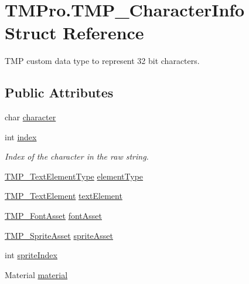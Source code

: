 \hypertarget{struct_t_m_pro_1_1_t_m_p___character_info}{}\section{T\+M\+Pro.\+T\+M\+P\+\_\+\+Character\+Info Struct Reference}
\label{struct_t_m_pro_1_1_t_m_p___character_info}


T\+MP custom data type to represent 32 bit characters.  


\subsection*{Public Attributes}
\begin{DoxyCompactItemize}
\item 
char \mbox{\hyperlink{struct_t_m_pro_1_1_t_m_p___character_info_a9d08f94119fec57a9e394ef47a3a626f}{character}}
\item 
int \mbox{\hyperlink{struct_t_m_pro_1_1_t_m_p___character_info_a222c925b04b4b83be44869fc309660e6}{index}}
\begin{DoxyCompactList}\small\item\em Index of the character in the raw string. \end{DoxyCompactList}\item 
\mbox{\hyperlink{namespace_t_m_pro_ab5662f47179bf1b81c575ecf80b24065}{T\+M\+P\+\_\+\+Text\+Element\+Type}} \mbox{\hyperlink{struct_t_m_pro_1_1_t_m_p___character_info_afa7f1363b87170b6275a010648dd3cbf}{element\+Type}}
\item 
\mbox{\hyperlink{class_t_m_pro_1_1_t_m_p___text_element}{T\+M\+P\+\_\+\+Text\+Element}} \mbox{\hyperlink{struct_t_m_pro_1_1_t_m_p___character_info_a996b92090bd50c1f706604137d8536a8}{text\+Element}}
\item 
\mbox{\hyperlink{class_t_m_pro_1_1_t_m_p___font_asset}{T\+M\+P\+\_\+\+Font\+Asset}} \mbox{\hyperlink{struct_t_m_pro_1_1_t_m_p___character_info_ade9e06ebc56c1d6bd5650241ca37814f}{font\+Asset}}
\item 
\mbox{\hyperlink{class_t_m_pro_1_1_t_m_p___sprite_asset}{T\+M\+P\+\_\+\+Sprite\+Asset}} \mbox{\hyperlink{struct_t_m_pro_1_1_t_m_p___character_info_a1fcfda0fbbe8bdb64248b86e9f97fc37}{sprite\+Asset}}
\item 
int \mbox{\hyperlink{struct_t_m_pro_1_1_t_m_p___character_info_afb6d405dc597104dab7ce83b1c04f236}{sprite\+Index}}
\item 
Material \mbox{\hyperlink{struct_t_m_pro_1_1_t_m_p___character_info_a4b6cdb2f82eaadcf803d2e3491411966}{material}}

\end{DoxyCompactItemize}
